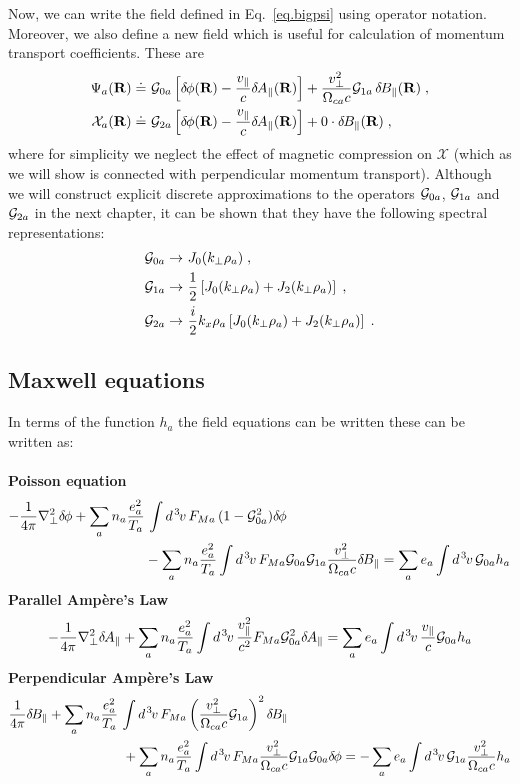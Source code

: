 Now, we can write the field defined in Eq.~\ref{eq.bigpsi} using operator 
notation.  Moreover, we also define a new field which is useful for 
calculation of momentum transport coefficients.  These are
%
\begin{align}
\Psi_a(\mathbf{R}) \doteq &~{\cal G}_{0a} \left[ \delta \hskip -1pt \phi(\mathbf{R}) - \frac{v_\parallel}{c} \delta \hskip -1pt A_\parallel(\mathbf{R}) \right]
 + \frac{v_\perp^2}{\Omega_{ca} c} {\cal G}_{1a} \, \delta \hskip -1pt B_\parallel(\mathbf{R}) \; , \\
\mathcal{X}_a(\mathbf{R}) \doteq &~{\cal G}_{2a} \left[ \delta \hskip -1pt \phi(\mathbf{R}) - \frac{v_\parallel}{c} \delta \hskip -1pt A_\parallel(\mathbf{R}) \right]
 + 0 \cdot\delta \hskip -1pt B_\parallel(\mathbf{R}) \; , 
\end{align}
%
where for simplicity we neglect the effect of magnetic compression
on $\mathcal{X}$ (which as we will show is connected with perpendicular 
momentum transport).  Although we will construct explicit discrete 
approximations to the operators ${\cal G}_{0a}$, ${\cal G}_{1a}$ and ${\cal G}_{2a}$
in the next chapter, it can be shown that they have the following 
spectral representations:
%
\begin{align}
{\cal G}_{0a} \rightarrow &~J_0(k_\perp \rho_a) \; , \\
{\cal G}_{1a} \rightarrow &~\frac{1}{2} \left[ 
  J_0(k_\perp \rho_a) + J_2(k_\perp \rho_a) \right] \; , \\
{\cal G}_{2a} \rightarrow &~\frac{i}{2} k_x \rho_a \left[ 
  J_0(k_\perp \rho_a) + J_2(k_\perp \rho_a) \right] \; .
\end{align}

\subsection{Maxwell equations}

In terms of the function $h_a$ the field equations can be written
these can be written as:\\
\\
%
{\bf Poisson equation}
%
\begin{align}
-\frac{1}{4 \pi} \nabla_\perp^2 \delta \hskip -1pt \phi 
+ \sum_a n_a \frac{e_a^2}{T_a} & \, \int d^{\hskip 1pt 3} \hskip -1pt v \, F_{Ma} \, (1-{\cal G}_{0a}^2) \delta \hskip -1pt \phi 
\nonumber \\
& - \sum_a n_a \frac{e_a^2}{T_a} \int d^{\hskip 1pt 3} \hskip -1pt v \, F_{Ma} {\cal G}_{0a} {\cal G}_{1a}
  \frac{v_\perp^2}{\Omega_{ca} c} \delta \hskip -1pt B_\parallel 
= \sum_a e_a \int d^{\hskip 1pt 3} \hskip -1pt v \, {\cal G}_{0a} h_a 
 \label{eq.maxp}
\end{align}
%
{\bf Parallel Amp\`ere's Law}
%
\begin{equation}
-\frac{1}{4 \pi} \nabla_\perp^2 \delta \hskip -1pt A_\parallel 
+ \sum_a n_a \frac{e_a^2}{T_a} \int d^{\hskip 1pt 3} \hskip -1pt v \, \frac{v_\parallel^2}{c^2} F_{Ma} {\cal G}_{0a}^2 \delta \hskip -1pt A_\parallel
= \sum_a e_a \int d^{\hskip 1pt 3} \hskip -1pt v \, \frac{v_\parallel}{c} {\cal G}_{0a} h_a 
 \label{eq.maxa1}
\end{equation}
%
{\bf Perpendicular Amp\`ere's Law}
%
\begin{align}
\frac{1}{4 \pi} \delta \hskip -1pt B_\parallel + \sum_a n_a \frac{e_a^2}{T_a} & \, \int d^{\hskip 1pt 3} \hskip -1pt v \, F_{Ma} 
\left( \frac{v_\perp^2}{\Omega_{ca} c} {\cal G}_{1a} \right)^2 \delta \hskip -1pt B_\parallel
\nonumber \\
&~ + \sum_a n_a \frac{e_a^2}{T_a} \int d^{\hskip 1pt 3} \hskip -1pt v \, F_{Ma} 
\frac{v_\perp^2}{\Omega_{ca} c} {\cal G}_{1a} {\cal G}_{0a} \delta \hskip -1pt \phi
= -\sum_a e_a \int d^{\hskip 1pt 3} \hskip -1pt v \, {\cal G}_{1a} \frac{v_\perp^2}{\Omega_{ca} c} h_a 
 \label{eq.maxa2}
\end{align}
%
